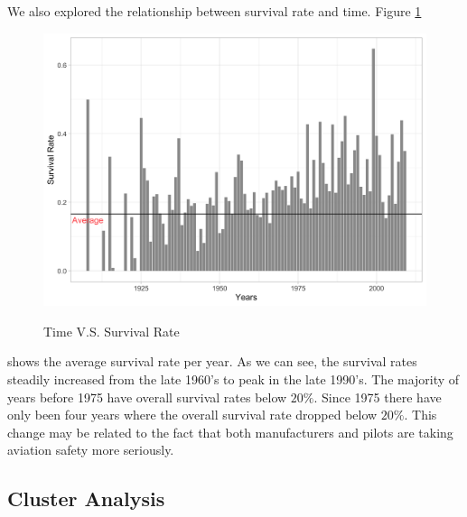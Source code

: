 \documentclass[12pt]{article}
\begin{document}
We also explored the relationship between survival rate and time. Figure \ref{fig:time_vs_surrate}
\begin{figure}[ht]
    \centering
    \caption{Time V.S. Survival Rate}
    \includegraphics[width=.75\textwidth]{time_vs_surrate-1.png}
    \label{fig:time_vs_surrate}
\end{figure}
shows the average survival rate per year. As we can see, the survival rates steadily increased from the late 1960's to peak in the late 1990's. The majority of years before 1975 have overall survival rates below $20\%$. Since 1975 there have only been four years where the overall survival rate dropped below $20\%$. This change may be related to the fact that both manufacturers and pilots are taking aviation safety more seriously. 

\subsection{Cluster Analysis}
\end{document}
